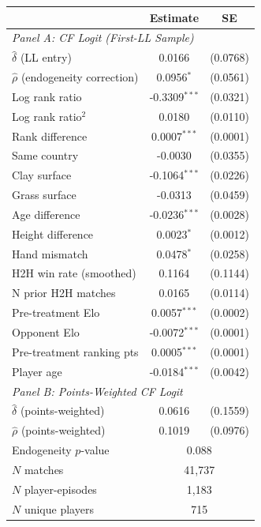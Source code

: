 \begin{tabular}{lcc}
\toprule
 & Estimate & SE \\
\midrule
\multicolumn{3}{l}{\textit{Panel A: CF Logit (First-LL Sample)}} \\[3pt]
$\hat{\delta}$ (LL entry) & 0.0166 & (0.0768) \\
$\hat{\rho}$ (endogeneity correction) & 0.0956$^{*}$ & (0.0561) \\
Log rank ratio & -0.3309$^{***}$ & (0.0321) \\
Log rank ratio$^2$ & 0.0180 & (0.0110) \\
Rank difference & 0.0007$^{***}$ & (0.0001) \\
Same country & -0.0030 & (0.0355) \\
Clay surface & -0.1064$^{***}$ & (0.0226) \\
Grass surface & -0.0313 & (0.0459) \\
Age difference & -0.0236$^{***}$ & (0.0028) \\
Height difference & 0.0023$^{*}$ & (0.0012) \\
Hand mismatch & 0.0478$^{*}$ & (0.0258) \\
H2H win rate (smoothed) & 0.1164 & (0.1144) \\
N prior H2H matches & 0.0165 & (0.0114) \\
Pre-treatment Elo & 0.0057$^{***}$ & (0.0002) \\
Opponent Elo & -0.0072$^{***}$ & (0.0001) \\
Pre-treatment ranking pts & 0.0005$^{***}$ & (0.0001) \\
Player age & -0.0184$^{***}$ & (0.0042) \\
\midrule
\multicolumn{3}{l}{\textit{Panel B: Points-Weighted CF Logit}} \\[3pt]
$\hat{\delta}$ (points-weighted) & 0.0616 & (0.1559) \\
$\hat{\rho}$ (points-weighted) & 0.1019 & (0.0976) \\
\midrule
Endogeneity $p$-value & \multicolumn{2}{c}{0.088} \\
$N$ matches & \multicolumn{2}{c}{41,737} \\
$N$ player-episodes & \multicolumn{2}{c}{1,183} \\
$N$ unique players & \multicolumn{2}{c}{715} \\
\bottomrule
\end{tabular}

